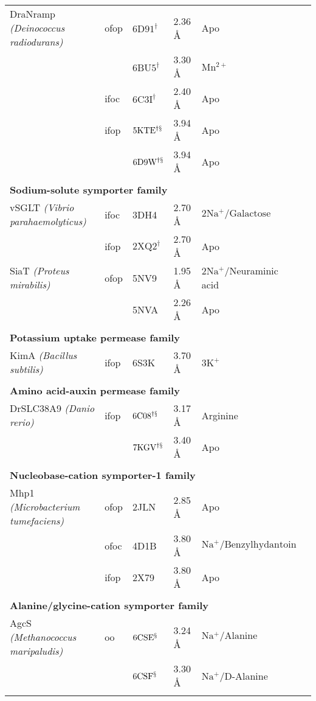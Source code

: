 \begin{center}
\begin{tabular}{l l l l l r}
DraNramp \emph{(Deinococcus radiodurans)} & \gls{ofop} & $\mathrm{6D91^{\dagger}}$ & 2.36 \AA & Apo & \citep*{Bozzi2019} \\
& & $\mathrm{6BU5^{\dagger}}$ & 3.30 \AA & $\mathrm{Mn^{2+}}$ & \citep*{Bozzi2019} \\
& \gls{ifoc} & $\mathrm{6C3I^{\dagger}}$ & 2.40 \AA & Apo & \citep*{Bozzi2019} \\
& \gls{ifop} & $\mathrm{5KTE^{\dagger \mathsection}}$ & 3.94 \AA & Apo & \citep*{Bozzi2016} \\
& & $\mathrm{6D9W^{\dagger \mathsection}}$ & 3.94 \AA & Apo & \citep*{Bozzi2019} \\
\\
\multicolumn{5}{l}{\textbf{Sodium-solute symporter family}} \\
vSGLT \emph{(Vibrio parahaemolyticus)} & \gls{ifoc} & 3DH4 & 2.70 \AA & $\mathrm{2Na^+/Galactose}$ & \citep*{Faham2008} \\
& \gls{ifop} & $\mathrm{2XQ2^{\dagger}}$ & 2.70 \AA & Apo & \citep*{Watanabe2010} \\
SiaT \emph{(Proteus mirabilis)} & \gls{ofop} & 5NV9 & 1.95 \AA & $\mathrm{2Na^+/}$Neuraminic acid & \citep*{Wahlgren2018} \\
& & 5NVA & 2.26 \AA & Apo &  \citep*{Wahlgren2018} \\
\\
\multicolumn{5}{l}{\textbf{Potassium uptake permease family}} \\
KimA \emph{(Bacillus subtilis)} & \gls{ifop} & 6S3K & 3.70 \AA & $\mathrm{3K^+}$ & \citep*{Tascon2020} \\
\\
\multicolumn{5}{l}{\textbf{Amino acid-auxin permease family}} \\
DrSLC38A9 \emph{(Danio rerio)} & \gls{ifop} & $\mathrm{6C08^{\dagger \mathsection}}$ & 3.17 \AA & Arginine & \citep*{Lei2018} \\
& & $\mathrm{7KGV^{\dagger \mathsection}}$ & 3.40 \AA & Apo & \citep*{Lei2021} \\
\\
\multicolumn{5}{l}{\textbf{Nucleobase-cation symporter-1 family}} \\
Mhp1 \emph{(Microbacterium tumefaciens)} & \gls{ofop} & 2JLN & 2.85 \AA & Apo & \citep*{Weyand2008} \\
& \gls{ofoc} & 4D1B & 3.80 \AA & $\mathrm{Na^+/Benzylhydantoin}$ & \citep*{Simmons2014} \\
& \gls{ifop} & 2X79 & 3.80 \AA & Apo & \citep*{Shimamura2010} \\
\\
\multicolumn{5}{l}{\textbf{Alanine/glycine-cation symporter family}} \\
AgcS \emph{(Methanococcus maripaludis)} & \gls{oo} & $\mathrm{6CSE^{\mathsection}}$ & 3.24 \AA & $\mathrm{Na^+/Alanine}$ & \citep*{Ma2018} \\
& & $\mathrm{6CSF^{\mathsection}}$ & 3.30 \AA & $\mathrm{Na^+/}$D-Alanine & \citep*{Ma2018} \\
\bottomrule \\
\end{tabular} 
\end{center}